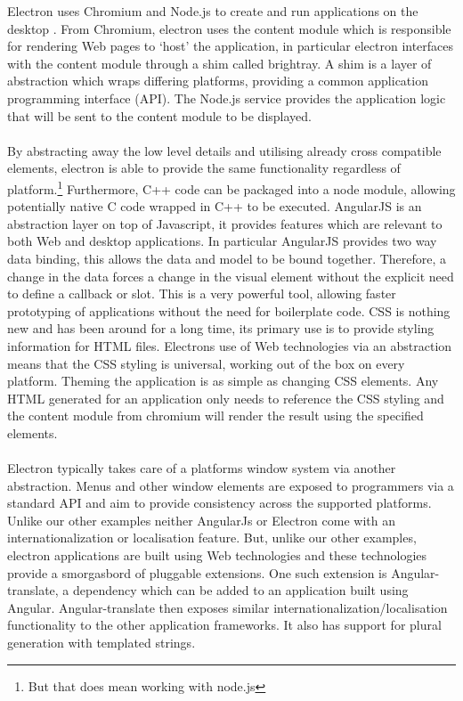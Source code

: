 %
  Electron uses Chromium and Node.js to create and run applications on the desktop \cite{electron_about}. From Chromium, electron uses the content module which is responsible for rendering Web pages to `host' the application, in particular electron interfaces with the content module through a shim called brightray\cite{electron_content_module}. A shim is a layer of abstraction which wraps differing platforms, providing a common application programming interface (API). The Node.js service provides the application logic that will be sent to the content module to be displayed.\\\\
  By abstracting away the low level details and utilising already cross compatible elements, electron is able to provide the same functionality regardless of platform.\footnote{But that does mean working with node.js} Furthermore, C++ code can be packaged into a node module, allowing potentially native C code wrapped in C++ to be executed.
  AngularJS is an abstraction layer on top of Javascript, it provides features which are relevant to both Web and desktop applications\cite{angular}. In particular AngularJS provides two way data binding, this allows the data and model to be bound together\cite{angular_data_binding}. Therefore, a change in the data forces a change in the visual element without the explicit need to define a callback or slot. This is a very powerful tool, allowing faster prototyping of applications without the need for boilerplate code.
  CSS is nothing new and has been around for a long time, its primary use is to provide styling information for HTML files. Electrons use of Web technologies via an abstraction means that the CSS styling is universal, working out of the box on every platform. Theming the application is as simple as changing CSS elements. Any HTML generated for an application only needs to reference the CSS styling and the content module from chromium will render the result using the specified elements.\\\\
  Electron typically takes care of a platforms window system via another abstraction. Menus\cite{electron_menu} and other window elements are exposed to programmers via a standard API and aim to provide consistency across the supported platforms.
  Unlike our other examples neither AngularJs or Electron come with an internationalization or localisation feature. But, unlike our other examples, electron applications are built using Web technologies and these technologies provide a smorgasbord of pluggable extensions. One such extension is Angular-translate, a dependency which can be added to an application built using Angular\cite{angular_translate}. Angular-translate then exposes similar internationalization/localisation functionality to the other application frameworks. It also has support for plural generation with templated strings.

